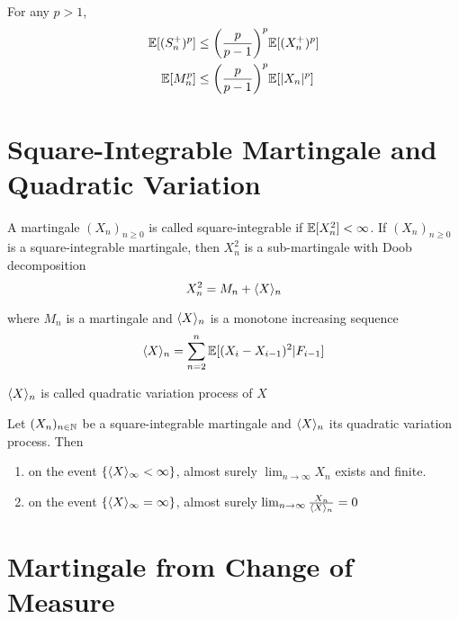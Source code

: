 \documentclass{report}
\begin{document}
\begin{theorem}
	For any $p > 1$,
	\begin{align*}
		\Exp[(S_n^+)^p] &\leq \tuple*{\frac{p}{p-1}}^p \Exp[(X_n^+)^p] \\
		\Exp[M_n^p] &\leq \tuple*{\frac{p}{p-1}}^p \Exp[|X_n|^p]
	\end{align*}
\end{theorem}

\section{Square-Integrable Martingale and Quadratic Variation}

\begin{definition}
	A martingale $(X_n)_{n \geq 0}$ is called square-integrable if $\mathbb{E}[X_n^2] < \infty$. If $(X_n)_{n \geq 0}$ is a square-integrable martingale, then $X_n^2$ is a sub-martingale with Doob decomposition
	$$
		X_n^2 = M_n + \langle X\rangle_n
	$$
	
	where $M_n$ is a martingale and $\langle X\rangle_n$ is a monotone increasing sequence
	$$
		\langle X\rangle_n = \sum_{n = 2}^n \mathbb{E}[(X_i - X_{i-1})^2 | F_{i-1}]
	$$
	
	$\langle X\rangle_n$ is called quadratic variation process of $X$
\end{definition}

\begin{theorem}
	Let $(X_n)_{n \in \mathbb{N}}$ be a square-integrable martingale and $\langle X\rangle_n$ its quadratic variation process. Then
	\begin{enumerate}
		\item on the event $\{\langle X\rangle_\infty < \infty\}$, almost surely $\lim_{n \to \infty} X_n$ exists and finite.
		
		\item on the event $\{\langle X\rangle_\infty = \infty\}$, almost surely $\lim_{n \to \infty} \frac{X_n}{\langle X\rangle_n} = 0$ 
	\end{enumerate}
\end{theorem}

\section{Martingale from Change of Measure}

\end{document}
